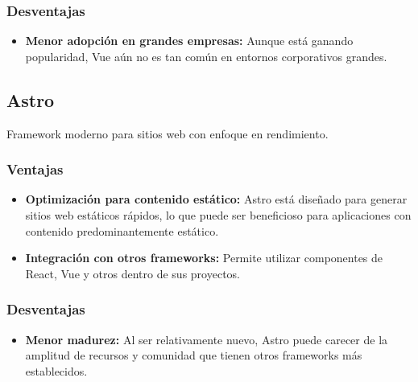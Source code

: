 \subsubsection{Desventajas}
\begin{itemize}
    \item \textbf{Menor adopción en grandes empresas:} Aunque está ganando popularidad, Vue aún no es tan común en entornos corporativos grandes.
\end{itemize}

\subsection{Astro}
Framework moderno para sitios web con enfoque en rendimiento.

\subsubsection{Ventajas}
\begin{itemize}
    \item \textbf{Optimización para contenido estático:} Astro está diseñado para generar sitios web estáticos rápidos, lo que puede ser beneficioso para aplicaciones con contenido predominantemente estático.
    
    \item \textbf{Integración con otros frameworks:} Permite utilizar componentes de React, Vue y otros dentro de sus proyectos.
\end{itemize}

\subsubsection{Desventajas}
\begin{itemize}
    \item \textbf{Menor madurez:} Al ser relativamente nuevo, Astro puede carecer de la amplitud de recursos y comunidad que tienen otros frameworks más establecidos.
\end{itemize}